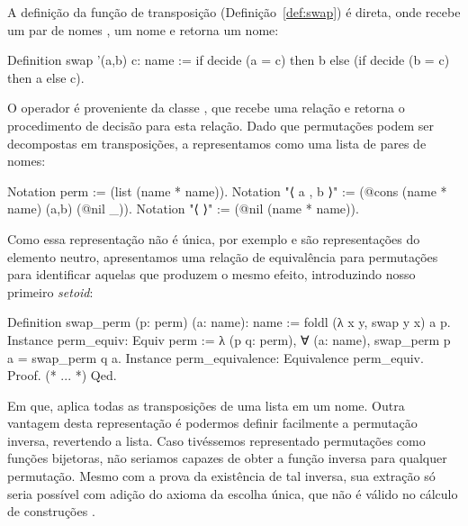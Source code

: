 A definição da função de transposição (Definição~\ref{def:swap}) é direta, onde recebe um par de nomes , um nome  e retorna um nome:
\begin{coqcode}
Definition swap '(a,b) c: name :=
   if decide (a = c) then b else (if decide (b = c) then a else c).
\end{coqcode}
O operador  é proveniente da classe , que recebe uma relação e retorna o procedimento de decisão para esta relação. 
Dado que permutações podem ser decompostas em transposições, a representamos como uma lista de pares de nomes:
\begin{coqcode}
Notation perm := (list (name * name)).
Notation "⟨ a , b ⟩" := (@cons (name * name) (a,b) (@nil _)).
Notation "⟨ ⟩" := (@nil (name * name)).
\end{coqcode}
Como essa representação não é única, por exemplo  e  são representações do elemento neutro, apresentamos uma relação de equivalência para permutações para identificar aquelas que produzem o mesmo efeito, introduzindo nosso primeiro \textit{setoid}:
\begin{coqcode}
Definition swap_perm (p: perm) (a: name): name :=
   foldl (λ x y, swap y x) a p.
Instance perm_equiv: Equiv perm :=
   λ (p q: perm), ∀ (a: name), swap_perm p a = swap_perm q a.
Instance perm_equivalence: Equivalence perm_equiv. Proof. (* ... *) Qed.
\end{coqcode}
Em que,  aplica todas as transposições de uma lista em um nome. Outra vantagem desta representação é podermos definir facilmente a permutação inversa, revertendo a lista. Caso tivéssemos representado permutações como funções bijetoras, não seriamos capazes de obter a função inversa para qualquer permutação. Mesmo com a prova da existência de tal inversa, sua extração só seria possível com adição do axioma da escolha única, que não é válido no cálculo de construções \cite{Maietti2017}.


